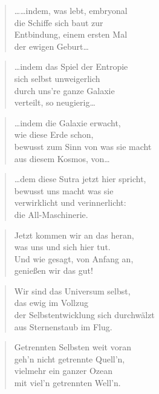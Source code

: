 \documentclass[10pt,a4paper]{article}
\begin{document}
\begin{multicols}{2}
\begin{verse}
……indem, was lebt, embryonal \\
die Schiffe sich baut zur \\
Entbindung, einem ersten Mal \\
der ewigen Geburt… \\
\end{verse}

\begin{verse}
…indem das Spiel der Entropie \\
sich selbst unweigerlich \\
durch uns’re ganze Galaxie \\
verteilt, so neugierig… \\
\end{verse}

\begin{verse}
…indem die Galaxie erwacht, \\
wie diese Erde schon, \\
bewusst zum Sinn von was sie macht \\
aus diesem Kosmos, von… \\
\end{verse}

\begin{verse}
…dem diese Sutra jetzt hier spricht, \\
bewusst uns macht was sie \\
verwirklicht und verinnerlicht: \\
die All-Maschinerie. \\
\end{verse}

\begin{verse}
Jetzt kommen wir an das heran, \\
was uns und sich hier tut. \\
Und wie gesagt, von Anfang an, \\
genießen wir das gut! \\
\end{verse}

\begin{verse}
Wir sind das Universum selbst, \\
das ewig im Vollzug \\
der Selbstentwicklung sich durchwälzt \\
aus Sternenstaub im Flug. \\
\end{verse}

\begin{verse}
Getrennten Selbsten weit voran \\
geh’n nicht getrennte Quell’n, \\
vielmehr ein ganzer Ozean \\
mit viel’n getrennten Well’n. \\
\end{verse}


\end{multicols}
\end{document}
